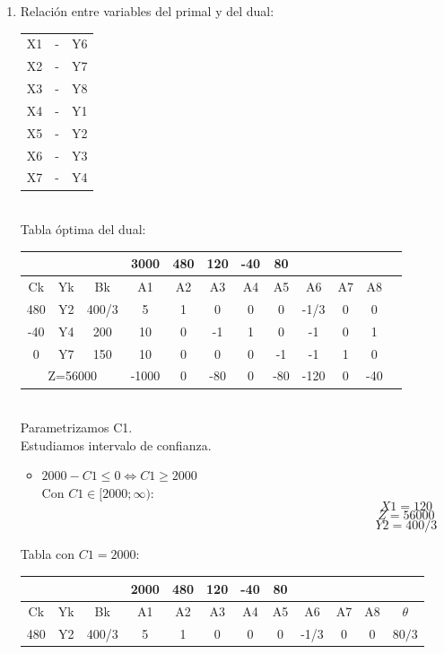 \documentclass{article}
\begin{document}
\begin{enumerate}
	\item Relaci\'on entre variables del primal y del dual:\\
		\begin{tabular}{c c c}
			X1 & - & Y6 \\
			X2 & - & Y7 \\
			X3 & - & Y8 \\
			X4 & - & Y1 \\
			X5 & - & Y2 \\
			X6 & - & Y3 \\
			X7 & - & Y4 \\
		\end{tabular}
		\\
		Tabla \'optima del dual:\\
		\begin{tabular}{|c  c  c | c  c  c  c  c  c  c  c | c |}
			\hline
			 \multicolumn{3}{|c|}{} & 3000 & 480 & 120 & -40 & 80 & & &\\ \hline
			 Ck & Yk & Bk & A1 & A2 & A3 & A4 & A5 & A6 & A7 & A8\\ \hline 
			 480 & Y2 & 400/3 & 5 & 1 & 0 & 0 & 0 & -1/3 & 0 & 0\\
			 -40 & Y4 & 200 & 10 & 0 & -1 & 1 & 0 & -1 & 0 & 1\\
			 0 & Y7 & 150 & 10 & 0 & 0 & 0 & -1 & -1 & 1 & 0\\ \hline
			 \multicolumn{3}{|c|}{Z=56000} & -1000 & 0 & -80 & 0 & -80 & -120 & 0 & -40\\ \hline
		\end{tabular}
		\medskip\\
		Parametrizamos C1.\\
		Estudiamos intervalo de confianza.
		\begin{itemize}
				\item $2000 - C1 \leq 0 \iff C1 \geq 2000$\\
					Con $C1 \in [2000; \infty)$:\\
					$$X1 = 120$$
					$$Z = 56000$$
					$$Y2 = 400/3$$
		\end{itemize}
		Tabla con $C1 = 2000$:\\
			\begin{tabular}{|c  c  c | c  c  c  c  c  c  c  c | c |}
			\hline
			 \multicolumn{3}{|c|}{} & 2000 & 480 & 120 & -40 & 80 & & & &\\ \hline
			 Ck & Yk & Bk & A1 & A2 & A3 & A4 & A5 & A6 & A7 & A8 & $\theta$\\ \hline 
			 480 & Y2 & 400/3 & 5 & 1 & 0 & 0 & 0 & -1/3 & 0 & 0 & $80/3$\\

\end{tabular}
\end{enumerate}
\end{document}
